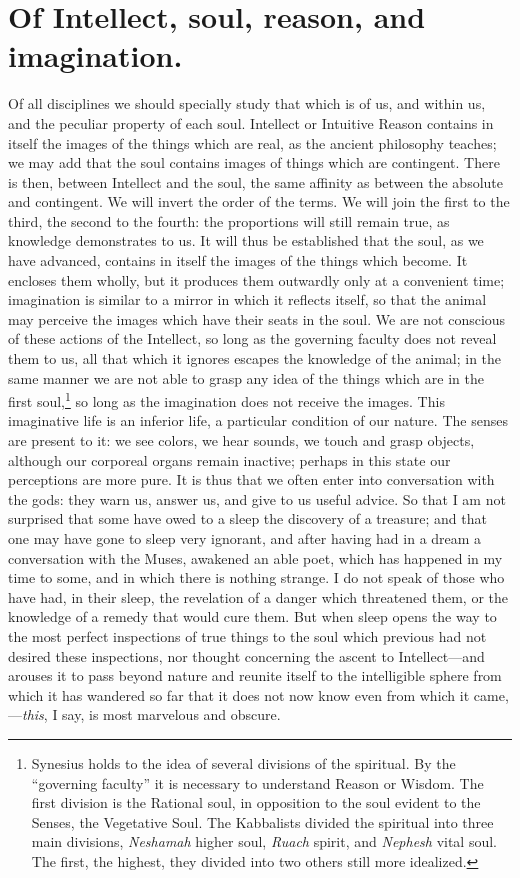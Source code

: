 \documentclass[12pt]{article}
\begin{document}
\section{Of Intellect, soul, reason, and imagination.}

Of all disciplines we should specially study that which is of us, and within
us, and the peculiar property of each soul. Intellect or Intuitive Reason
contains in itself the images of the things which are real, as the ancient
philosophy teaches; we may add that the soul contains images of things which
are contingent. There is then, between Intellect and the soul, the same
affinity as between the absolute and contingent. We will invert the order of
the terms. We will join the first to the third, the second to the fourth: the
proportions will still remain true, as knowledge demonstrates to us. It will
thus be established that the soul, as we have advanced, contains in itself the
images of the things which become. It encloses them wholly, but it produces
them outwardly only at a convenient time; imagination is similar to a mirror in
which it reflects itself, so that the animal may perceive the images which have
their seats in the soul. We are not conscious of these actions of the
Intellect, so long as the governing faculty does not reveal them to us, all
that which it ignores escapes the knowledge of the animal; in the same manner
we are not able to grasp any idea of the things which are in the first
soul,\footnote{Synesius holds to the idea of several divisions of the
spiritual. By the ``governing faculty'' it is necessary to understand Reason or
Wisdom. The first division is the Rational soul, in opposition to the soul
evident to the Senses, the Vegetative Soul. The Kabbalists divided the
spiritual into three main divisions, \textit{Neshamah} higher soul,
\textit{Ruach} spirit, and \textit{Nephesh} vital soul. The first, the highest,
they divided into two others still more idealized.} so long as the imagination
does not receive the images. This imaginative life is an inferior life, a
particular condition of our nature. The senses are present to it: we see
colors, we hear sounds, we touch and grasp objects, although our corporeal
organs remain inactive; perhaps in this state our perceptions are more pure. It
is thus that we often enter into conversation with the gods: they warn us,
answer us, and give to us useful advice. So that I am not surprised that some
have owed to a sleep the discovery of a treasure; and that one may have gone to
sleep very ignorant, and after having had in a dream a conversation with the
Muses, awakened an able poet, which has happened in my time to some, and in
which there is nothing strange. I do not speak of those who have had, in their
sleep, the revelation of a danger which threatened them, or the knowledge of a
remedy that would cure them. But when sleep opens the way to the most perfect
inspections of true things to the soul which previous had not desired these
inspections, nor thought concerning the ascent to Intellect---and arouses it to
pass beyond nature and reunite itself to the intelligible sphere from which it
has wandered so far that it does not now know even from which it
came,---\textit{this}, I say, is most marvelous and obscure.
\end{document}
